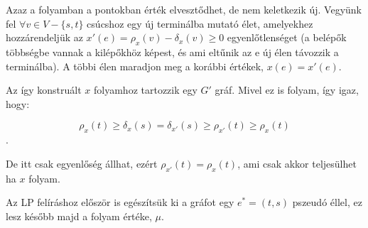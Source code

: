 Azaz a folyamban a pontokban érték elvesztődhet, de nem keletkezik új.
Vegyünk fel $\forall v \in V-\{s,t\}$ csúcshoz egy új terminálba mutató élet,
amelyekhez hozzárendeljük az $x'(e)=\rho_x(v)-\delta_x(v) \geq 0$
egyenlőtlenséget (a belépők többségbe vannak a kilépőkhöz képest, és ami
eltűnik az e új élen távozzik a terminálba). A többi élen maradjon meg a
korábbi értékek, $x(e)=x'(e)$.

Az így konstruált $x$ folyamhoz tartozzik egy $G'$ gráf.  Mivel ez is folyam,
így igaz, hogy:

\[\rho_{x}(t) \geq \delta_{x}(s) = \delta_{x'}(s) \geq \rho_{x'}(t) \geq
	\rho_{x}(t)\].

De itt csak egyenlőség állhat, ezért $\rho_{x'}(t)=\rho_{x}(t)$, ami csak akkor
teljesülhet ha $x$ folyam.

Az LP felíráshoz először is egészítsük ki a gráfot egy $e^*=(t,s)$ pszeudó
éllel, ez lesz később majd a folyam értéke, $\mu$.

